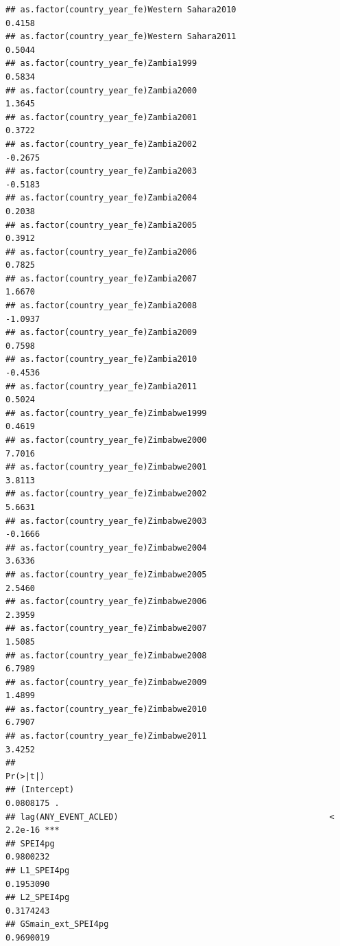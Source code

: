 \documentclass[
  a4paper,
]{article}
\begin{document}
\begin{verbatim}
## as.factor(country_year_fe)Western Sahara2010                    0.4158
## as.factor(country_year_fe)Western Sahara2011                    0.5044
## as.factor(country_year_fe)Zambia1999                            0.5834
## as.factor(country_year_fe)Zambia2000                            1.3645
## as.factor(country_year_fe)Zambia2001                            0.3722
## as.factor(country_year_fe)Zambia2002                           -0.2675
## as.factor(country_year_fe)Zambia2003                           -0.5183
## as.factor(country_year_fe)Zambia2004                            0.2038
## as.factor(country_year_fe)Zambia2005                            0.3912
## as.factor(country_year_fe)Zambia2006                            0.7825
## as.factor(country_year_fe)Zambia2007                            1.6670
## as.factor(country_year_fe)Zambia2008                           -1.0937
## as.factor(country_year_fe)Zambia2009                            0.7598
## as.factor(country_year_fe)Zambia2010                           -0.4536
## as.factor(country_year_fe)Zambia2011                            0.5024
## as.factor(country_year_fe)Zimbabwe1999                          0.4619
## as.factor(country_year_fe)Zimbabwe2000                          7.7016
## as.factor(country_year_fe)Zimbabwe2001                          3.8113
## as.factor(country_year_fe)Zimbabwe2002                          5.6631
## as.factor(country_year_fe)Zimbabwe2003                         -0.1666
## as.factor(country_year_fe)Zimbabwe2004                          3.6336
## as.factor(country_year_fe)Zimbabwe2005                          2.5460
## as.factor(country_year_fe)Zimbabwe2006                          2.3959
## as.factor(country_year_fe)Zimbabwe2007                          1.5085
## as.factor(country_year_fe)Zimbabwe2008                          6.7989
## as.factor(country_year_fe)Zimbabwe2009                          1.4899
## as.factor(country_year_fe)Zimbabwe2010                          6.7907
## as.factor(country_year_fe)Zimbabwe2011                          3.4252
##                                                                 Pr(>|t|)    
## (Intercept)                                                    0.0808175 .  
## lag(ANY_EVENT_ACLED)                                           < 2.2e-16 ***
## SPEI4pg                                                        0.9800232    
## L1_SPEI4pg                                                     0.1953090    
## L2_SPEI4pg                                                     0.3174243    
## GSmain_ext_SPEI4pg                                             0.9690019    

\end{verbatim}
\end{document}
